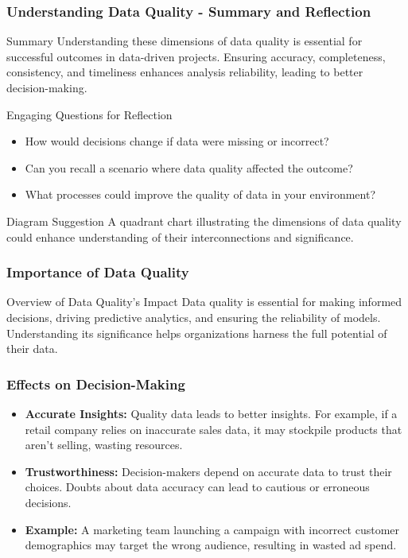 \documentclass[aspectratio=169]{beamer}
\begin{document}
\begin{frame}[fragile]
    \frametitle{Understanding Data Quality - Summary and Reflection}
    \begin{block}{Summary}
        Understanding these dimensions of data quality is essential for successful outcomes in data-driven projects. 
        Ensuring accuracy, completeness, consistency, and timeliness enhances analysis reliability, leading to better decision-making.
    \end{block}
    
    \begin{block}{Engaging Questions for Reflection}
        \begin{itemize}
            \item How would decisions change if data were missing or incorrect?
            \item Can you recall a scenario where data quality affected the outcome?
            \item What processes could improve the quality of data in your environment?
        \end{itemize}
    \end{block}

    \begin{block}{Diagram Suggestion}
        A quadrant chart illustrating the dimensions of data quality could enhance understanding of their interconnections and significance.
    \end{block}
\end{frame}

\begin{frame}[fragile]
    \frametitle{Importance of Data Quality}
    \begin{block}{Overview of Data Quality's Impact}
        Data quality is essential for making informed decisions, driving predictive analytics, and ensuring the reliability of models. Understanding its significance helps organizations harness the full potential of their data.
    \end{block}
\end{frame}

\begin{frame}[fragile]
    \frametitle{Effects on Decision-Making}
    \begin{itemize}
        \item \textbf{Accurate Insights:} Quality data leads to better insights. For example, if a retail company relies on inaccurate sales data, it may stockpile products that aren’t selling, wasting resources.
        \item \textbf{Trustworthiness:} Decision-makers depend on accurate data to trust their choices. Doubts about data accuracy can lead to cautious or erroneous decisions.
        \item \textbf{Example:} A marketing team launching a campaign with incorrect customer demographics may target the wrong audience, resulting in wasted ad spend.
    \end{itemize}
\end{frame}
\end{document}
